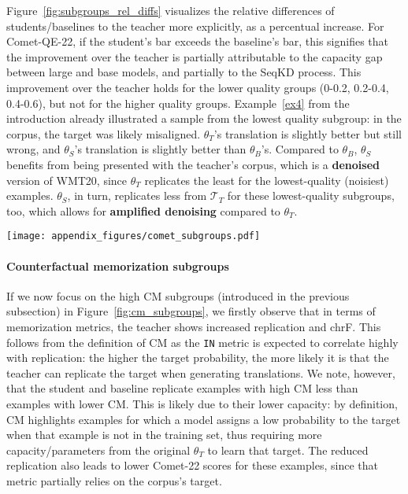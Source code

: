 Figure~\ref{fig:subgroups_rel_diffs} visualizes the relative differences of students/baselines to the teacher more explicitly, as a percentual increase.
For Comet-QE-22, if the student's bar exceeds the baseline's bar, this signifies that the improvement over the teacher is partially attributable to the capacity gap between large and base models, and partially to the SeqKD process.
This improvement over the teacher holds for the lower quality groups (0-0.2, 0.2-0.4, 0.4-0.6), but not for the higher quality groups.
Example~\ref{ex4} from the introduction already illustrated a sample from the lowest quality subgroup: in the corpus, the target was likely misaligned. $\theta_T$'s translation is slightly better but still wrong, and $\theta_S$'s translation is slightly better than $\theta_B$'s.
Compared to $\theta_B$, $\theta_S$ benefits from being presented with the teacher's corpus, which is a \textbf{denoised} version of WMT20, since $\theta_T$ replicates the least for the lowest-quality (noisiest) examples.
$\theta_S$, in turn, replicates less from $\mathcal{T}_T$ for these lowest-quality subgroups, too, which allows for \textbf{amplified denoising} compared to $\theta_T$.

\vspace{0.1cm}
\noindent\begin{minipage}{\textwidth}
    \texttt{[image: appendix\_figures/comet\_subgroups.pdf]}
    \label{fig:comet_subgroups}
\end{minipage}
\vspace{0.15cm}

\paragraph{Counterfactual memorization subgroups}
If we now focus on the high CM subgroups (introduced in the previous subsection) in Figure~\ref{fig:cm_subgroups}, we firstly observe that in terms of memorization metrics, the teacher shows increased replication and chrF. This follows from the definition of CM as the \texttt{IN} metric is expected to correlate highly with replication: the higher the target probability, the more likely it is that the teacher can replicate the target when generating translations. We note, however, that the student and baseline replicate examples with high CM less than examples with lower CM. This is likely due to their lower capacity: by definition, CM highlights examples for which a model assigns a low probability to the target when that example is not in the training set, thus requiring more capacity/parameters from the original $\theta_T$ to learn that target.
The reduced replication also leads to lower Comet-22 scores for these examples, since that metric partially relies on the corpus's target.


